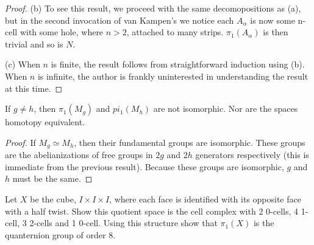 \documentclass[10pt]{article}
\begin{document}
\begin{proof}
(b) To see this result, we proceed with the same decomopositions as (a), but in
the second invocation of van Kampen's we notice each $A_{\alpha}$ is now some
n-cell with some hole, where $n > 2$, attached to many strips.
$\pi_1(A_{\alpha})$ is then trivial and so is $N$.

(c) When $n$ is finite, the result follows from straightforward induction using
(b). When $n$ is infinite, the author is frankly uninterested in understanding
the result at this time.
\end{proof}

\begin{theorem}
	If $g \neq h$, then $\pi_1(M_g)$ and $pi_1(M_h)$ are not isomorphic. Nor are the spaces homotopy equivalent.
\end{theorem}

\begin{proof}
	If $M_g \simeq M_h$, then their fundamental groups are isomorphic. These groups are the abelianizations of free groups in $2g$ and $2h$ generators respectively (this is immediate from the previous result). Because these groups are isomorphic, $g$ and $h$ must be the same.
\end{proof}

\begin{exercise}[1.2.14]
	Let $X$ be the cube, $I \times I \times I$, where each face is identified with
	its opposite face with a half twist. Show this quotient space is the
	cell complex with 2 0-cells, 4 1-cell, 3 2-cells and 1 0-cell. Using this
	structure show that $\pi_1(X)$ is the quanternion group of order 8.
\end{exercise}
\end{document}
